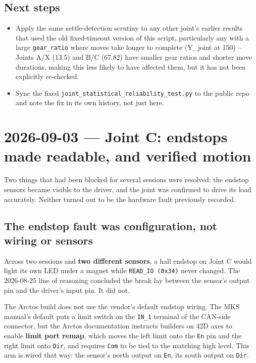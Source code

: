 \documentclass[11pt,letterpaper]{article}
\begin{document}
\subsection{Next steps}
\begin{itemize}
    \item Apply the same settle-detection scrutiny to any other joint's earlier results that used the old fixed-timeout version of this script, particularly any with a large \texttt{gear\_ratio} where moves take longer to complete (Y\_joint at 150) -- Joints A/X (13.5) and B/C (67.82) have smaller gear ratios and shorter move durations, making this less likely to have affected them, but it has not been explicitly re-checked.
    \item Sync the fixed \texttt{joint\_statistical\_reliability\_test.py} to the public repo and note the fix in its own history, not just here.
\end{itemize}


\section{2026-09-03 --- Joint C: endstops made readable, and verified motion}
\label{sec:session-2026-09-03}
Two things that had been blocked for several sessions were resolved: the endstop
sensors became visible to the driver, and the joint was confirmed to drive its
load accurately. Neither turned out to be the hardware fault previously recorded.

\subsection{The endstop fault was configuration, not wiring or sensors}
Across two sessions and \textbf{two different sensors}, a hall endstop on Joint C
would light its own LED under a magnet while \texttt{READ\_IO (0x34)} never
changed. The 2026-08-25 line of reasoning concluded the break lay between the
sensor's output pin and the driver's input pin. It did not.

The Arctos build does not use the vendor's default endstop wiring. The MKS
manual's default puts a limit switch on the \texttt{IN\_1} terminal of the
CAN-side connector, but the Arctos documentation instructs builders on 42D axes
to enable \textbf{limit port remap}, which moves the left limit onto the
\texttt{En} pin and the right limit onto \texttt{Dir}, and requires \texttt{Com}
to be tied to the matching high level. This arm is wired that way: the
sensor's north output on \texttt{En}, its south output on \texttt{Dir}.
\end{document}

